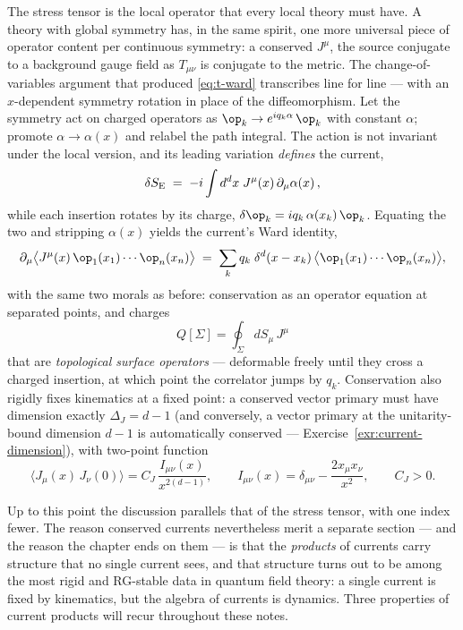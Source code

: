 The stress tensor is the local operator that every local theory must have. A
theory with global symmetry has, in the same spirit, one more universal
piece of operator content per continuous symmetry: a conserved 
$J^\mu$, the source conjugate to a background gauge field as $T_{\mu\nu}$ is
conjugate to the metric. The change-of-variables argument that produced
\eqref{eq:t-ward} transcribes line for line --- with an $x$-dependent
symmetry rotation in place of the diffeomorphism. Let the symmetry act on
charged operators as $\op_k \to e^{iq_k\alpha}\,\op_k$ with constant
$\alpha$; promote $\alpha \to \alpha(x)$ and relabel the path integral. The
action is not invariant under the local version, and its leading variation
\emph{defines} the current,
\begin{equation}
\delta S_{\rm E} \;=\; -i\int d^dx \;J^\mu(x)\, \partial_\mu \alpha(x)\,,
\end{equation}
while each insertion rotates by its charge, $\delta\op_k = i q_k\,
\alpha(x_k)\,\op_k$. Equating the two and stripping $\alpha(x)$ yields the
current's Ward identity,
\begin{equation}
\partial_\mu \big\langle J^{\mu}(x)\,\op_1(x_1)\cdots\op_n(x_n)\big\rangle
\;=\; \sum_{k} q_k\; \delta^d(x - x_k)\,
\big\langle \op_1(x_1)\cdots\op_n(x_n)\big\rangle ,
\label{eq:j-ward}
\end{equation}
with the same two morals as before: conservation as an
operator equation at separated points, and charges
\begin{equation}
Q[\Sigma] = \oint_\Sigma dS_\mu \, J^\mu
\label{eq:current-charge}
\end{equation}
that are \emph{topological surface operators} --- deformable freely until
they cross a charged insertion, at which point the correlator jumps by
$q_k$.
Conservation also rigidly fixes kinematics at a fixed point: a conserved
vector primary must have dimension exactly $\Delta_J = d - 1$ (and conversely,
a vector primary at the unitarity-bound dimension $d-1$ is automatically
conserved --- Exercise~\ref{exr:current-dimension}), with two-point function
\begin{equation}
\langle J_\mu(x)\, J_\nu(0)\rangle
= C_J\, \frac{I_{\mu\nu}(x)}{x^{2(d-1)}},
\qquad
I_{\mu\nu}(x) = \delta_{\mu\nu} - \frac{2 x_\mu x_\nu}{x^2},
\qquad C_J > 0.
\label{eq:jj-2pt}
\end{equation}

Up to this point the discussion parallels that of the stress tensor, with
one index fewer. The reason conserved currents nevertheless merit a separate
section --- and the reason the chapter ends on them --- is that the
\emph{products} of currents carry structure that no single current sees, and
that structure turns out to be among the most rigid and RG-stable data in
quantum field theory: a single current is fixed by kinematics, but the
algebra of currents is dynamics. Three properties of current products will
recur throughout these notes.

